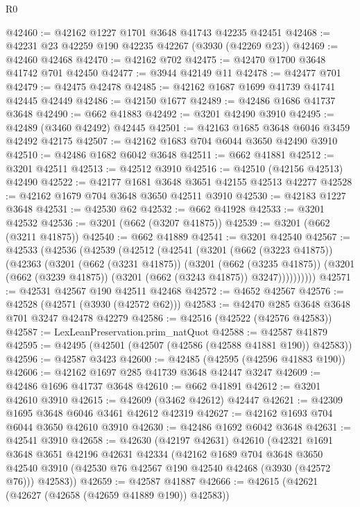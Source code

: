 \begin{lexlean}{R0}
\begin{coremodule}
@42460 := @42162 @1227 @1701 @3648 @41743 @42235 @42451
@42468 := @42231 @23 @42259 @190 @42235 @42267 (@3930 (@42269 @23))
@42469 := @42460 @42468
@42470 := @42162 @702
@42475 := @42470 @1700 @3648 @41742 @701 @42450
@42477 := @3944 @42149 @11
@42478 := @42477 @701
@42479 := @42475 @42478
@42485 := @42162 @1687 @1699 @41739 @41741 @42445 @42449
@42486 := @42150 @1677
@42489 := @42486 @1686 @41737 @3648
@42490 := @662 @41883
@42492 := @3201 @42490 @3910
@42495 := @42489 (@3460 @42492) @42445
@42501 := @42163 @1685 @3648 @6046 @3459 @42492 @42175
@42507 := @42162 @1683 @704 @6044 @3650 @42490 @3910
@42510 := @42486 @1682 @6042 @3648
@42511 := @662 @41881
@42512 := @3201 @42511
@42513 := @42512 @3910
@42516 := @42510 (@42156 @42513) @42490
@42522 := @42177 @1681 @3648 @3651 @42155 @42513 @42277
@42528 := @42162 @1679 @704 @3648 @3650 @42511 @3910
@42530 := @42183 @1227 @3648
@42531 := @42530 @62
@42532 := @662 @41928
@42533 := @3201 @42532
@42536 := @3201 (@662 (@3207 @41875))
@42539 := @3201 (@662 (@3211 @41875))
@42540 := @662 @41889
@42541 := @3201 @42540
@42567 := @42533
    (@42536
      (@42539
        (@42512
          (@42541
            (@3201
              (@662 (@3223 @41875))
              (@42363
                (@3201
                  (@662 (@3231 @41875))
                  (@3201
                    (@662 (@3235 @41875))
                    (@3201 (@662 (@3239 @41875)) (@3201 (@662 (@3243 @41875)) @3247))))))))))
@42571 := @42531 @42567 @190 @42511 @42468
@42572 := @4652 @42567
@42576 := @42528 (@42571 (@3930 (@42572 @62)))
@42583 := @42470 @285 @3648 @3648 @701 @3247 @42478 @42279
@42586 := @42516 (@42522 (@42576 @42583))
@42587 := LexLeanPreservation.prim_natQuot
@42588 := @42587 @41879
@42595 := @42495 (@42501 (@42507 (@42586 (@42588 @41881 @190)) @42583))
@42596 := @42587 @3423
@42600 := @42485 (@42595 (@42596 @41883 @190))
@42606 := @42162 @1697 @285 @41739 @3648 @42447 @3247
@42609 := @42486 @1696 @41737 @3648
@42610 := @662 @41891
@42612 := @3201 @42610 @3910
@42615 := @42609 (@3462 @42612) @42447
@42621 := @42309 @1695 @3648 @6046 @3461 @42612 @42319
@42627 := @42162 @1693 @704 @6044 @3650 @42610 @3910
@42630 := @42486 @1692 @6042 @3648
@42631 := @42541 @3910
@42658 := @42630
    (@42197 @42631)
    @42610
    (@42321
      @1691
      @3648
      @3651
      @42196
      @42631
      @42334
      (@42162
        @1689
        @704
        @3648
        @3650
        @42540
        @3910
        (@42530 @76 @42567 @190 @42540 @42468 (@3930 (@42572 @76)))
        @42583))
@42659 := @42587 @41887
@42666 := @42615 (@42621 (@42627 (@42658 (@42659 @41889 @190)) @42583))

\end{coremodule}
\end{lexlean}

